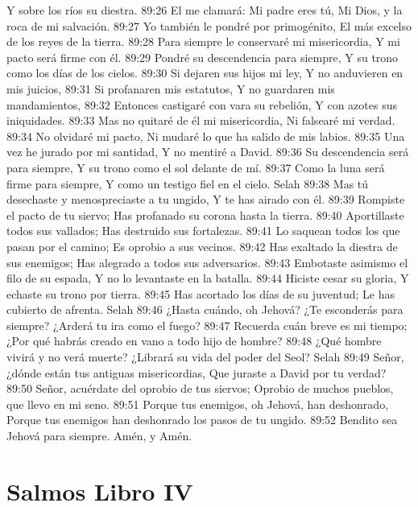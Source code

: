 Y sobre los ríos su diestra. 
89:26 El me clamará: Mi padre eres tú, 
Mi Dios, y la roca de mi salvación. 
89:27 Yo también le pondré por primogénito, 
El más excelso de los reyes de la tierra. 
89:28 Para siempre le conservaré mi misericordia, 
Y mi pacto será firme con él. 
89:29 Pondré su descendencia para siempre, 
Y su trono como los días de los cielos. 
89:30 Si dejaren sus hijos mi ley, 
Y no anduvieren en mis juicios, 
89:31 Si profanaren mis estatutos, 
Y no guardaren mis mandamientos, 
89:32 Entonces castigaré con vara su rebelión, 
Y con azotes sus iniquidades. 
89:33 Mas no quitaré de él mi misericordia, 
Ni falsearé mi verdad. 
89:34 No olvidaré mi pacto, 
Ni mudaré lo que ha salido de mis labios. 
89:35 Una vez he jurado por mi santidad, 
Y no mentiré a David. 
89:36 Su descendencia será para siempre, 
Y su trono como el sol delante de mí. 
89:37 Como la luna será firme para siempre, 
Y como un testigo fiel en el cielo. Selah 
89:38 Mas tú desechaste y menospreciaste a tu ungido, 
Y te has airado con él. 
89:39 Rompiste el pacto de tu siervo; 
Has profanado su corona hasta la tierra. 
89:40 Aportillaste todos sus vallados; 
Has destruido sus fortalezas. 
89:41 Lo saquean todos los que pasan por el camino; 
Es oprobio a sus vecinos. 
89:42 Has exaltado la diestra de sus enemigos; 
Has alegrado a todos sus adversarios. 
89:43 Embotaste asimismo el filo de su espada, 
Y no lo levantaste en la batalla. 
89:44 Hiciste cesar su gloria, 
Y echaste su trono por tierra. 
89:45 Has acortado los días de su juventud; 
Le has cubierto de afrenta. Selah 
89:46 ¿Hasta cuándo, oh Jehová? ¿Te esconderás para siempre? 
¿Arderá tu ira como el fuego? 
89:47 Recuerda cuán breve es mi tiempo; 
¿Por qué habrás creado en vano a todo hijo de hombre? 
89:48 ¿Qué hombre vivirá y no verá muerte? 
¿Librará su vida del poder del Seol? Selah 
89:49 Señor, ¿dónde están tus antiguas misericordias, 
Que juraste a David por tu verdad? 
89:50 Señor, acuérdate del oprobio de tus siervos; 
Oprobio de muchos pueblos, que llevo en mi seno. 
89:51 Porque tus enemigos, oh Jehová, han deshonrado, 
Porque tus enemigos han deshonrado los pasos de tu ungido. 
89:52 Bendito sea Jehová para siempre. 
Amén, y Amén.


\chapter{Salmos Libro IV}

